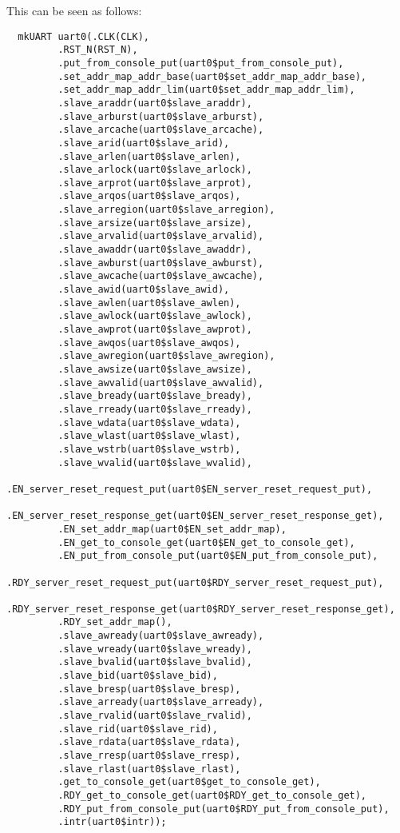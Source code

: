 \documentclass[a4paper,8pt]{report}
\begin{document}
This can be seen as follows:
\tiny
\begin{verbatim}
  mkUART uart0(.CLK(CLK),
         .RST_N(RST_N),
         .put_from_console_put(uart0$put_from_console_put),
         .set_addr_map_addr_base(uart0$set_addr_map_addr_base),
         .set_addr_map_addr_lim(uart0$set_addr_map_addr_lim),
         .slave_araddr(uart0$slave_araddr),
         .slave_arburst(uart0$slave_arburst),
         .slave_arcache(uart0$slave_arcache),
         .slave_arid(uart0$slave_arid),
         .slave_arlen(uart0$slave_arlen),
         .slave_arlock(uart0$slave_arlock),
         .slave_arprot(uart0$slave_arprot),
         .slave_arqos(uart0$slave_arqos),
         .slave_arregion(uart0$slave_arregion),
         .slave_arsize(uart0$slave_arsize),
         .slave_arvalid(uart0$slave_arvalid),
         .slave_awaddr(uart0$slave_awaddr),
         .slave_awburst(uart0$slave_awburst),
         .slave_awcache(uart0$slave_awcache),
         .slave_awid(uart0$slave_awid),
         .slave_awlen(uart0$slave_awlen),
         .slave_awlock(uart0$slave_awlock),
         .slave_awprot(uart0$slave_awprot),
         .slave_awqos(uart0$slave_awqos),
         .slave_awregion(uart0$slave_awregion),
         .slave_awsize(uart0$slave_awsize),
         .slave_awvalid(uart0$slave_awvalid),
         .slave_bready(uart0$slave_bready),
         .slave_rready(uart0$slave_rready),
         .slave_wdata(uart0$slave_wdata),
         .slave_wlast(uart0$slave_wlast),
         .slave_wstrb(uart0$slave_wstrb),
         .slave_wvalid(uart0$slave_wvalid),
         .EN_server_reset_request_put(uart0$EN_server_reset_request_put),
         .EN_server_reset_response_get(uart0$EN_server_reset_response_get),
         .EN_set_addr_map(uart0$EN_set_addr_map),
         .EN_get_to_console_get(uart0$EN_get_to_console_get),
         .EN_put_from_console_put(uart0$EN_put_from_console_put),
         .RDY_server_reset_request_put(uart0$RDY_server_reset_request_put),
         .RDY_server_reset_response_get(uart0$RDY_server_reset_response_get),
         .RDY_set_addr_map(),
         .slave_awready(uart0$slave_awready),
         .slave_wready(uart0$slave_wready),
         .slave_bvalid(uart0$slave_bvalid),
         .slave_bid(uart0$slave_bid),
         .slave_bresp(uart0$slave_bresp),
         .slave_arready(uart0$slave_arready),
         .slave_rvalid(uart0$slave_rvalid),
         .slave_rid(uart0$slave_rid),
         .slave_rdata(uart0$slave_rdata),
         .slave_rresp(uart0$slave_rresp),
         .slave_rlast(uart0$slave_rlast),
         .get_to_console_get(uart0$get_to_console_get),
         .RDY_get_to_console_get(uart0$RDY_get_to_console_get),
         .RDY_put_from_console_put(uart0$RDY_put_from_console_put),
         .intr(uart0$intr));
\end{verbatim}
\normalsize
\end{document}

